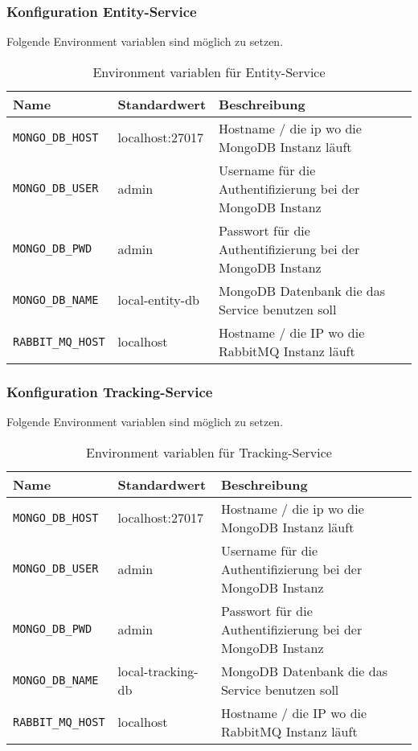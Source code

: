 \subsubsection{Konfiguration Entity-Service}
Folgende Environment variablen sind möglich zu setzen.


\begin{table}[h]
	\begin{tabular}{|l|l|l|}
		\hline
		Name & Standardwert & Beschreibung \\ \hline
		\verb|MONGO_DB_HOST| & localhost:27017 &  Hostname / die ip wo die MongoDB Instanz läuft \\ \hline
		\verb|MONGO_DB_USER| & admin  &  Username für die Authentifizierung bei der MongoDB Instanz \\ \hline
		\verb|MONGO_DB_PWD| & admin &  Passwort für die Authentifizierung bei der MongoDB Instanz \\ \hline
		\verb|MONGO_DB_NAME| & local-entity-db &  MongoDB Datenbank die das Service benutzen soll \\ \hline
		\verb|RABBIT_MQ_HOST| & localhost &  Hostname / die IP wo die RabbitMQ Instanz läuft \\ \hline
	\end{tabular}
	\caption{Environment variablen für Entity-Service }
\end{table}

\subsubsection{Konfiguration Tracking-Service}
Folgende Environment variablen sind möglich zu setzen.


\begin{table}[h]
	\begin{tabular}{|l|l|l|}
		\hline
		Name & Standardwert & Beschreibung \\ \hline
		\verb|MONGO_DB_HOST| & localhost:27017 &  Hostname / die ip wo die MongoDB Instanz läuft \\ \hline
		\verb|MONGO_DB_USER| & admin  &  Username für die Authentifizierung bei der MongoDB Instanz \\ \hline
		\verb|MONGO_DB_PWD| & admin &  Passwort für die Authentifizierung bei der MongoDB Instanz \\ \hline
		\verb|MONGO_DB_NAME| & local-tracking-db &  MongoDB Datenbank die das Service benutzen soll \\ \hline
		\verb|RABBIT_MQ_HOST| & localhost &  Hostname / die IP wo die RabbitMQ Instanz läuft \\ \hline
	\end{tabular}
	\caption{Environment variablen für Tracking-Service }
\end{table}

